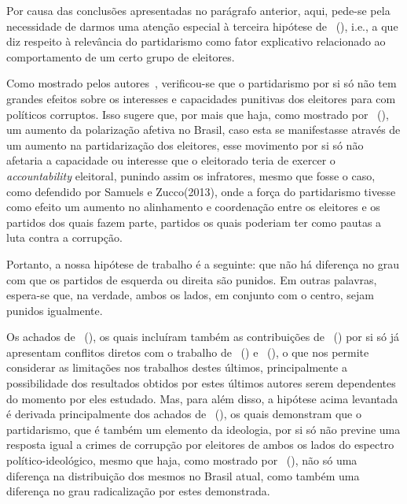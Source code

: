 \documentclass[
	12pt,				%
	openright,			%
	twoside,			%
	a4paper,			%
	openany,
	english,			%
	brazil				%
	]{abntex2}
\begin{document}
Por causa das conclusões apresentadas no parágrafo anterior, aqui, pede-se pela necessidade de darmos uma atenção especial à terceira hipótese de ~(\citeyear{Botero2021Apr}), i.e., a que diz respeito à relevância do partidarismo como fator explicativo relacionado ao comportamento de um certo grupo de eleitores. 

Como mostrado pelos autores~\cite{Botero2021Apr}, verificou-se que o partidarismo por si só não tem grandes efeitos sobre os interesses e capacidades punitivas dos eleitores para com políticos corruptos. Isso sugere que, por mais que haja, como mostrado por ~(\citeyear{fuks2020afeto}), um aumento da polarização afetiva no Brasil, caso esta se manifestasse através de um aumento na partidarização dos eleitores, esse movimento por si só não afetaria a capacidade ou interesse que o eleitorado teria de exercer o \textit{accountability} eleitoral, punindo assim os infratores, mesmo que fosse o caso, como defendido por Samuels e Zucco(2013), onde a força do partidarismo tivesse como efeito um aumento no alinhamento e coordenação entre os eleitores e os partidos dos quais fazem parte, partidos os quais poderiam ter como pautas a luta contra a corrupção. 

Portanto, a nossa hipótese de trabalho é a seguinte: que não há diferença no grau com que os partidos de esquerda ou direita são punidos. Em outras palavras, espera-se que, na verdade, ambos os lados, em conjunto com o centro, sejam punidos igualmente.



Os achados de ~(\citeyear{dunning2019voter}), os quais incluíram também as contribuições de ~(\citeyear{Boas2019Apr}) por si só já apresentam conflitos diretos com o trabalho de ~(\citeyear{ferraz2008exposing}) e ~(\citeyear{Avis2018Oct}), o que nos permite considerar as limitações nos trabalhos destes últimos, principalmente a possibilidade dos resultados obtidos por estes últimos autores serem dependentes do momento por eles estudado. Mas, para além disso, a hipótese acima levantada é derivada principalmente dos achados de ~(\citeyear{Botero2021Apr}), os quais demonstram que o partidarismo, que é também um elemento da ideologia, por si só não previne uma resposta igual a crimes de corrupção por eleitores de ambos os lados do espectro político-ideológico, mesmo que haja, como mostrado por ~(\citeyear{fuks2020afeto}), não só uma diferença na distribuição dos mesmos no Brasil atual, como também uma diferença no grau radicalização por estes demonstrada. 
\end{document}

